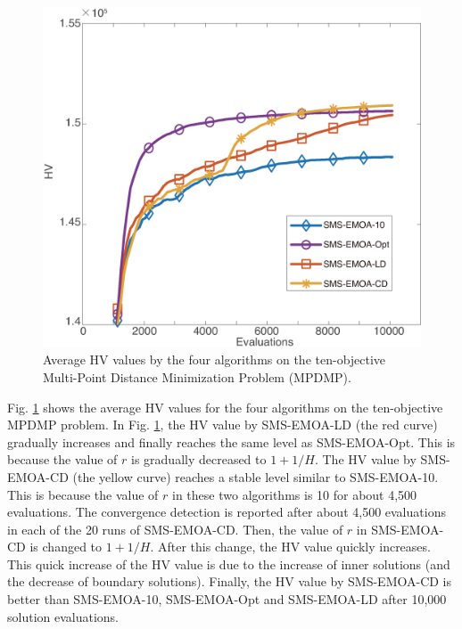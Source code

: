 \documentclass[conference]{IEEEtran}
\begin{document}
\begin{figure}[!t]
  \centering
    \includegraphics[width=\columnwidth]{SMSEMOA_MPDMP_hv_2}
  \caption{Average HV values by the four algorithms on the ten-objective Multi-Point Distance Minimization Problem (MPDMP).
  }
  \label{crdmp}
\end{figure}

Fig. \ref{crdmp} shows the average HV values for the four algorithms on the ten-objective MPDMP problem. 
In Fig. \ref{crdmp}, the HV value by SMS-EMOA-LD (the red curve) gradually increases and finally reaches the same level as SMS-EMOA-Opt. 
This is because the value of $r$ is gradually decreased to $1+1/H$. 
The HV value by SMS-EMOA-CD (the yellow curve) reaches a stable level similar to SMS-EMOA-10. 
This is because the value of $r$ in these two algorithms is 10 for about 4,500 evaluations. 
The convergence detection is reported after about 4,500 evaluations in each of the 20 runs of SMS-EMOA-CD. 
Then, the value of $r$ in SMS-EMOA-CD is changed to $1+1/H$. After this change, the HV value quickly increases. 
This quick increase of the HV value is due to the increase of inner solutions (and the decrease of boundary solutions).
Finally, the HV value by SMS-EMOA-CD is better than SMS-EMOA-10, SMS-EMOA-Opt and SMS-EMOA-LD after 10,000 solution evaluations. 
\end{document}
